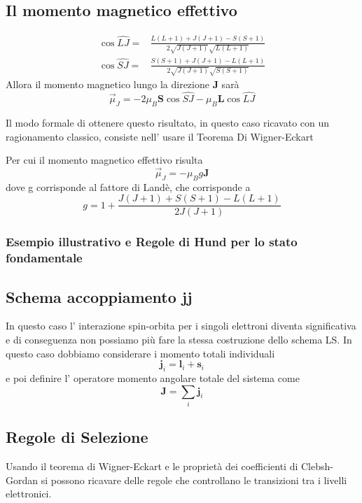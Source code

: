 \subsection{Il momento magnetico effettivo}
\begin{align*}
  \cos \widehat{LJ} =& \frac{L(L+1)+J(J+1)-S(S+1)}{2\sqrt{J(J+1)}\sqrt{L(L+1)}}\\
  \cos \widehat{SJ} =& \frac{S(S+1)+J(J+1)-L(L+1)}{2\sqrt{J(J+1)}\sqrt{S(S+1)}}
\end{align*}
Allora il momento magnetico lungo la direzione $\mathbf{J}$ sarà
\begin{equation*}
  \vec{\mu}_J  = -2 \mu_B \mathbf{S}\cos \widehat{SJ} -\mu_B \mathbf{L}\cos\widehat{LJ}
\end{equation*}
\begin{deepbox}{}
  Il modo formale di ottenere questo risultato, in questo caso ricavato con un ragionamento classico, consiste nell' usare il Teorema Di Wigner-Eckart 
\end{deepbox}
Per cui il momento magnetico effettivo risulta
\begin{equation*}
  \vec{\mu}_J = -\mu_B g \mathbf{J}
\end{equation*}
dove g corrisponde al fattore di Landè, che corrisponde a 
\begin{equation*}
  g = 1 + \frac{J(J+1)+S(S+1)-L(L+1)}{2J(J+1)}
\end{equation*}
\subsubsection{Esempio illustrativo e Regole di Hund per lo stato fondamentale}
\subsection{Schema accoppiamento jj}
In questo caso l' interazione spin-orbita per i singoli elettroni diventa significativa e di conseguenza non possiamo più fare la stessa costruzione dello schema LS. In questo caso dobbiamo considerare i momento totali individuali 
\begin{equation*}
  \mathbf{j}_i = \mathbf{l}_i+\mathbf{s}_i
\end{equation*}
e poi definire l' operatore momento angolare totale del sistema come 
\begin{equation*}
  \mathbf{J} = \sum_{i} \mathbf{j}_i
\end{equation*}



\subsection{Regole di Selezione}
Usando il teorema di Wigner-Eckart e le proprietà dei coefficienti di Clebsh-Gordan si possono ricavare delle regole che controllano le transizioni tra i livelli elettronici.




